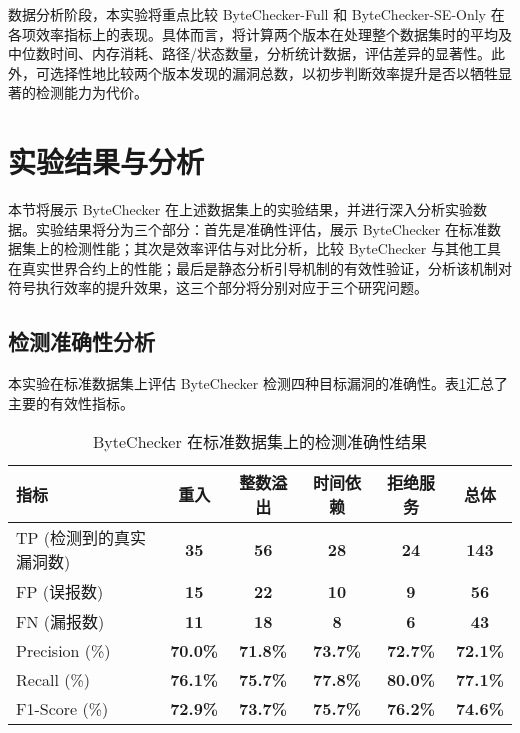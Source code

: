 \documentclass[print, master, vlined, timesmath]{DissertUESTC}
\begin{document}
数据分析阶段，本实验将重点比较 ByteChecker-Full 和 ByteChecker-SE-Only 在各项效率指标上的表现。具体而言，将计算两个版本在处理整个数据集时的平均及中位数时间、内存消耗、路径/状态数量，分析统计数据，评估差异的显著性。此外，可选择性地比较两个版本发现的漏洞总数，以初步判断效率提升是否以牺牲显著的检测能力为代价。


\section{实验结果与分析}

本节将展示 ByteChecker 在上述数据集上的实验结果，并进行深入分析实验数据。实验结果将分为三个部分：首先是准确性评估，展示 ByteChecker 在标准数据集上的检测性能；其次是效率评估与对比分析，比较 ByteChecker 与其他工具在真实世界合约上的性能；最后是静态分析引导机制的有效性验证，分析该机制对符号执行效率的提升效果，这三个部分将分别对应于三个研究问题。

\subsection{检测准确性分析}

本实验在标准数据集上评估 ByteChecker 检测四种目标漏洞的准确性。表\ref{tab:accuracy_results_ch5}汇总了主要的有效性指标。

\begin{table}
    \centering
    \caption{ByteChecker 在标准数据集上的检测准确性结果}
    \begin{tabular}{lccccc}
    \toprule
    指标 & 重入 & 整数溢出 & 时间依赖 & 拒绝服务 & \textbf{总体} \\ 
    \midrule
    TP (检测到的真实漏洞数) & \textbf{35} & \textbf{56} & \textbf{28} & \textbf{24} & \textbf{143} \\ 
    FP (误报数) & \textbf{15} & \textbf{22} & \textbf{10} & \textbf{9} & \textbf{56} \\ 
    FN (漏报数) & \textbf{11} & \textbf{18} & \textbf{8} & \textbf{6} & \textbf{43} \\ 
    \midrule
    Precision (\%) & \textbf{70.0\%} & \textbf{71.8\%} & \textbf{73.7\%} & \textbf{72.7\%} & \textbf{72.1\%} \\ 
    Recall  (\%) & \textbf{76.1\%} & \textbf{75.7\%} & \textbf{77.8\%} & \textbf{80.0\%} & \textbf{77.1\%} \\ 
    F1-Score (\%) & \textbf{72.9\%} & \textbf{73.7\%} & \textbf{75.7\%} & \textbf{76.2\%} & \textbf{74.6\%} \\ 
    \bottomrule
    \end{tabular}
    \label{tab:accuracy_results_ch5}
\end{table}
\end{document}
